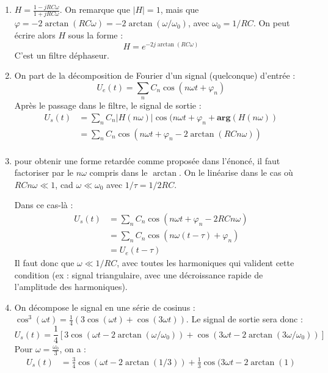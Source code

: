 \begin{correction}

\begin{enumerate}
	\item
	$H=\frac{1-jRC\omega}{1+jRC\omega}$. On remarque que $\mid H\mid=1$, mais que $\varphi=-2\arctan(RC\omega)=-2\arctan(\omega/\omega_0)$, avec $\omega_0=1/RC$. On peut écrire alors $H$ sous la forme :
	\begin{equation}
		H=e^{-2j\arctan(RC\omega)}
	\end{equation}
C'est un filtre déphaseur.

	\item
	On part de la décomposition de Fourier d'un signal (quelconque) d'entrée :
\begin{equation}
	U_e(t) = \sum_n C_n\cos(n\omega t + \varphi_n)
\end{equation}	
Après le passage dans le filtre, le signal de sortie :	
\begin{equation}
	\begin{array}{lll}
		U_s(t) & = \sum_n C_n|H(n\omega)|\cos(n\omega t + \varphi_n + \mathbf{arg}(H(n\omega)) \\

		 & = \sum_n C_n\cos(n\omega t + \varphi_n -2\arctan(RCn\omega)) \\
	\end{array}
\end{equation}	

		
	\item pour obtenir une forme retardée comme proposée dans l'énoncé, il faut factoriser par le $n\omega$ compris dans le $\arctan$. On le linéarise dans le cas où $RCn\omega\ll1$, cad $\omega\ll\omega_0$ avec $1/\tau=1/2RC$. 
	
	Dans ce cas-là :
\begin{equation}
	\begin{array}{lll}
		U_s(t) & = \sum_n C_n\cos(n\omega t + \varphi_n -2RCn\omega) \\

		 & = \sum_n C_n\cos(n\omega (t-\tau) + \varphi_n) \\
		 &= U_e(t-\tau)
	\end{array}
\end{equation}			
	Il faut donc que $\omega\ll 1/RC$, avec toutes les harmoniques qui valident cette condition (ex : signal triangulaire, avec une décroissance rapide de l'amplitude des harmoniques).
	
	\item On décompose le signal en une série de cosinus : $\cos^3(\omega t)=\frac{1}{4}(3\cos(\omega t) + \cos(3\omega t))$.
	Le signal de sortie sera donc : 
	\begin{equation}
	U_s(t) = \frac{1}{4}\left[ 3\cos(\omega t - 2\arctan(\omega/\omega_0)) + \cos(3\omega t - 2\arctan(3\omega/\omega_0))\right] 
	\end{equation}
	Pour $\omega = \frac{\omega_{0}}{3}$, on a :
\begin{equation}
	\begin{array}{lll}
		U_s(t) & = \frac{3}{4}\cos(\omega t - 2\arctan(1/3)) + \frac{1}{3}\cos(3\omega t - 2\arctan(1) \\


\end{array}
\end{equation}
\end{enumerate}
\end{correction}
